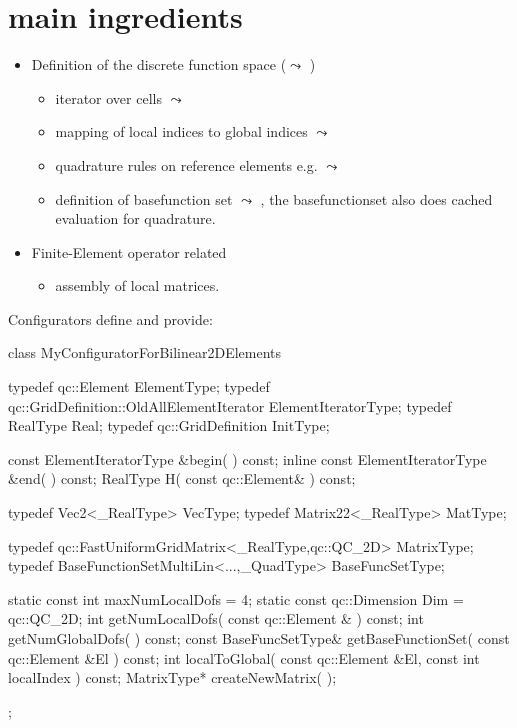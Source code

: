\section{main ingredients}

\begin{itemize}
\item Definition of the discrete function space ($\leadsto$ )
  \begin{itemize}
  \item iterator over cells $\leadsto$ 
  \item mapping of local indices to global indices $\leadsto$ 
  \item quadrature rules on reference elements e.g. $\leadsto$ 
  \item definition of basefunction set $\leadsto$ , the basefunctionset also does cached evaluation
for quadrature.
  \end{itemize}
\item Finite-Element operator related
  \begin{itemize}
    \item assembly of local matrices.
  \end{itemize}
\end{itemize}

{\small
Configurators define and provide:
\begin{myverbatim}
class MyConfiguratorForBilinear2DElements {
  typedef qc::Element                                ElementType;
  typedef qc::GridDefinition::OldAllElementIterator  ElementIteratorType;
  typedef RealType                                   Real;
  typedef qc::GridDefinition                         InitType;

  const ElementIteratorType &begin( ) const;
  inline const ElementIteratorType &end( ) const;
  RealType H( const qc::Element& ) const;

  typedef Vec2<_RealType>     VecType;
  typedef Matrix22<_RealType> MatType;

  typedef qc::FastUniformGridMatrix<_RealType,qc::QC_2D> MatrixType;
  typedef BaseFunctionSetMultiLin<...,_QuadType> BaseFuncSetType;

  static const int maxNumLocalDofs = 4;
  static const qc::Dimension Dim = qc::QC_2D;
  int getNumLocalDofs( const qc::Element & ) const;
  int getNumGlobalDofs( ) const;
  const BaseFuncSetType& getBaseFunctionSet( const qc::Element &El ) const;
  int localToGlobal( const qc::Element &El, const int localIndex ) const;
  MatrixType* createNewMatrix( );
};
\end{myverbatim}
}

